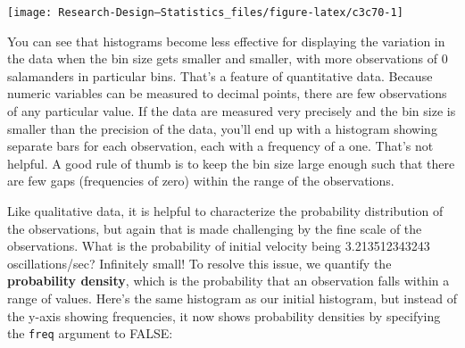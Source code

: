 \documentclass[
]{book}
\newenvironment{Shaded}{\begin{snugshade}}{\end{snugshade}}
\newcommand{\AttributeTok}[1]{\textcolor[rgb]{0.13,0.29,0.53}{#1}}
\newcommand{\DecValTok}[1]{\textcolor[rgb]{0.00,0.00,0.81}{#1}}
\newcommand{\FloatTok}[1]{\textcolor[rgb]{0.00,0.00,0.81}{#1}}
\newcommand{\FunctionTok}[1]{\textcolor[rgb]{0.13,0.29,0.53}{\textbf{#1}}}
\newcommand{\NormalTok}[1]{#1}
\newcommand{\SpecialCharTok}[1]{\textcolor[rgb]{0.81,0.36,0.00}{\textbf{#1}}}
\newcommand{\StringTok}[1]{\textcolor[rgb]{0.31,0.60,0.02}{#1}}
\begin{document}
\begin{Shaded}
\end{Shaded}

\begin{center}\texttt{[image: Research-Design---Statistics\_files/figure-latex/c3c70-1]} \end{center}

You can see that histograms become less effective for displaying the variation in the data when the bin size gets smaller and smaller, with more observations of 0 salamanders in particular bins. That's a feature of quantitative data. Because numeric variables can be measured to decimal points, there are few observations of any particular value. If the data are measured very precisely and the bin size is smaller than the precision of the data, you'll end up with a histogram showing separate bars for each observation, each with a frequency of a one. That's not helpful. A good rule of thumb is to keep the bin size large enough such that there are few gaps (frequencies of zero) within the range of the observations.

Like qualitative data, it is helpful to characterize the probability distribution of the observations, but again that is made challenging by the fine scale of the observations. What is the probability of initial velocity being 3.213512343243 oscillations/sec? Infinitely small! To resolve this issue, we quantify the \textbf{probability density}, which is the probability that an observation falls within a range of values. Here's the same histogram as our initial histogram, but instead of the y-axis showing frequencies, it now shows probability densities by specifying the \texttt{freq} argument to FALSE:
\end{document}
